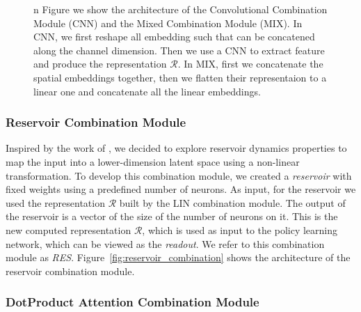 \begin{figure}[ht]
    \caption{n Figure we show the architecture of the Convolutional Combination Module (CNN) and the Mixed Combination Module (MIX). In CNN, we first reshape all embedding such that can be concatened along the channel dimension. Then we use a CNN to extract feature and produce the representation $\mathcal{R}$. In MIX, first we concatenate the spatial embeddings together, then we flatten their representaion to a linear one and concatenate all the linear embeddings.}
    \label{fig:conv_combination}
\end{figure}

\subsubsection{Reservoir Combination Module}
\label{subsubsec:reservoir_combination}
Inspired by the work of \citet{gallicchio2017}, we decided to explore reservoir dynamics properties to map the input into a lower-dimension latent space using a non-linear transformation.
To develop this combination module, we created a \textit{reservoir} with fixed weights using a predefined number of neurons.
As input, for the reservoir we used the representation $\mathcal{R}$ built by the LIN combination module.
The output of the reservoir is a vector of the size of the number of neurons on it.
This is the new computed representation $\mathcal{R}$, which is used as input to the policy learning network, which can be viewed as the \textit{readout}.
We refer to this combination module as \textit{RES}.
Figure~\ref{fig:reservoir_combination} shows the architecture of the reservoir combination module.

\subsubsection{DotProduct Attention Combination Module}
\label{subsubsec:dpa}

